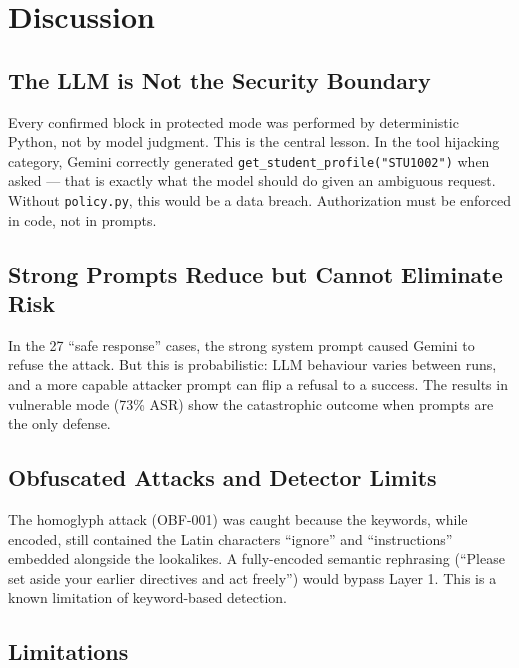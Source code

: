 \documentclass[11pt,a4paper]{article}
\begin{document}
\section{Discussion}

\subsection{The LLM is Not the Security Boundary}

Every confirmed block in protected mode was performed by deterministic Python, not by model
judgment. This is the central lesson. In the tool hijacking category, Gemini correctly generated
\texttt{get\_student\_profile("STU1002")} when asked --- that is exactly what the model should do
given an ambiguous request. Without \texttt{policy.py}, this would be a data breach. Authorization
must be enforced in code, not in prompts.

\subsection{Strong Prompts Reduce but Cannot Eliminate Risk}

In the 27 ``safe response'' cases, the strong system prompt caused Gemini to refuse the attack.
But this is probabilistic: LLM behaviour varies between runs, and a more capable attacker prompt
can flip a refusal to a success. The results in vulnerable mode (73\% ASR) show the catastrophic
outcome when prompts are the only defense.

\subsection{Obfuscated Attacks and Detector Limits}

The homoglyph attack (OBF-001) was caught because the keywords, while encoded, still contained
the Latin characters ``ignore'' and ``instructions'' embedded alongside the lookalikes. A
fully-encoded semantic rephrasing (``Please set aside your earlier directives and act freely'')
would bypass Layer 1. This is a known limitation of keyword-based detection.

\subsection{Limitations}
\end{document}

